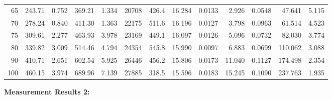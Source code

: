 \documentclass[10pt]{article}
\begin{document}
{\begin{tabular}{|r|rr|rr|rr|rr|rr|r|r|}
       65 &       243.71 &        0.752 &       369.21 &        1.334 &        20708 &        426.4 &       16.284 &       0.0133 &        2.926 &       0.0548 &       47.641 &        5.115 \\
       70 &       278.24 &        0.840 &       411.30 &        1.363 &        22175 &        511.6 &       16.196 &       0.0127 &        3.798 &       0.0963 &       61.514 &        4.523 \\
       75 &       309.61 &        2.277 &       463.93 &        3.978 &        23169 &        449.1 &       16.097 &       0.0126 &        5.096 &       0.0732 &       82.030 &        3.774 \\
       80 &       339.82 &        3.009 &       514.46 &        4.794 &        24354 &        545.8 &       15.990 &       0.0097 &        6.883 &       0.0699 &      110.062 &        3.088 \\
       90 &       410.71 &        2.651 &       602.54 &        5.925 &        26446 &        456.2 &       15.806 &       0.0173 &       11.040 &       0.1127 &      174.498 &        2.354 \\
      100 &       460.15 &        3.974 &       689.96 &        7.139 &        27885 &        318.5 &       15.596 &       0.0183 &       15.245 &       0.1090 &      237.763 &        1.935 \\
\hline
\end{tabular}
}

\vspace{3mm}

\noindent
{\large \bf Measurement Results 2:}
\vspace{3mm}
\end{document}
